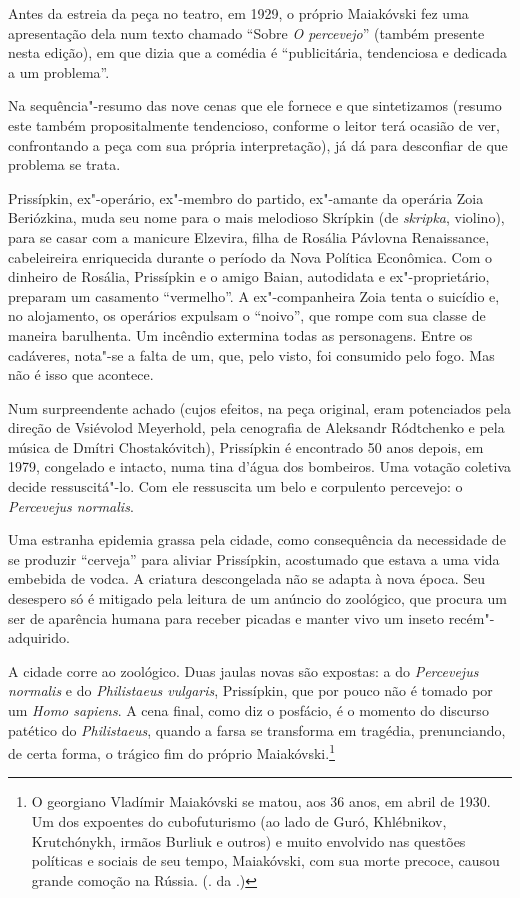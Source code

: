 Antes da estreia da peça no teatro, em 1929, o próprio Maiakóvski fez
uma apresentação dela num texto chamado ``Sobre \emph{O percevejo}''
(também presente nesta edição), em que dizia que a comédia é
``publicitária, tendenciosa e dedicada a um problema''.

Na sequência"-resumo das nove cenas que ele fornece e que sintetizamos
(resumo este também propositalmente tendencioso, conforme o leitor terá
ocasião de ver, confrontando a peça com sua própria interpretação), já
dá para desconfiar de que problema se trata.

Prissípkin, ex"-operário, ex"-membro do partido, ex"-amante da operária
Zoia Beriózkina, muda seu nome para o mais melodioso Skrípkin (de
\emph{skripka}, violino), para se casar com a manicure Elzevira, filha
de Rosália Pávlovna Renaissance, cabeleireira enriquecida durante o
período da Nova Política Econômica. Com o dinheiro de Rosália,
Prissípkin e o amigo Baian, autodidata e ex"-proprietário, preparam um
casamento ``vermelho''. A ex"-companheira Zoia tenta o suicídio e, no
alojamento, os operários expulsam o ``noivo'', que rompe com sua classe de
maneira barulhenta. Um incêndio extermina todas as personagens. Entre os
cadáveres, nota"-se a falta de um, que, pelo visto, foi consumido pelo
fogo. Mas não é isso que acontece.

Num surpreendente achado (cujos efeitos, na peça original, eram
potenciados pela direção de Vsiévolod Meyerhold, pela cenografia de
Aleksandr Ródtchenko e pela música de Dmítri Chostakóvitch), Prissípkin é encontrado 50 anos depois, em 1979, congelado e intacto, numa tina
d'água dos bombeiros. Uma votação coletiva decide ressuscitá"-lo. Com ele
ressuscita um belo e corpulento percevejo: o \emph{Percevejus normalis}.

Uma estranha epidemia grassa pela cidade, como consequência da
necessidade de se produzir ``cerveja'' para aliviar Prissípkin, acostumado
que estava a uma vida embebida de vodca. A criatura descongelada não se
adapta à nova época. Seu desespero só é mitigado pela leitura de um
anúncio do zoológico, que procura um ser de aparência humana para
receber picadas e manter vivo um inseto recém"-adquirido.

A cidade corre ao zoológico. Duas jaulas novas são expostas: a do
\emph{Percevejus normalis} e do \emph{Philistaeus vulgaris},
Prissípkin, que por pouco não é tomado por um \emph{Homo sapiens}. A
cena final, como diz o posfácio, é o momento do discurso patético do
\emph{Philistaeus}, quando a farsa se transforma em tragédia,
prenunciando, de certa forma, o trágico fim do próprio Maiakóvski.\footnote{O georgiano Vladímir Maiakóvski se matou, aos 36 anos, em abril de 1930. Um dos expoentes do cubofuturismo (ao lado de Guró, Khlébnikov, Krutchónykh, irmãos Burliuk e outros) e muito envolvido nas questões políticas e sociais de seu tempo, Maiakóvski, com sua morte precoce, causou grande comoção na Rússia. (. da .)}

